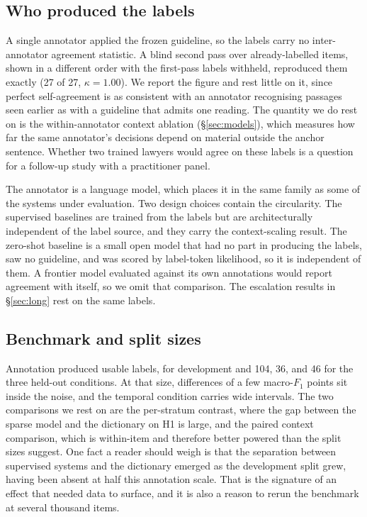 \subsection*{Who produced the labels} A single annotator applied the frozen
guideline, so the labels carry no inter-annotator agreement statistic. A blind
second pass over already-labelled items, shown in a different order with the
first-pass labels withheld, reproduced them exactly (27 of 27, $\kappa=1.00$). We
report the figure and rest little on it, since perfect self-agreement is as
consistent with an annotator recognising passages seen earlier as with a
guideline that admits one reading. The quantity we do rest on is the
within-annotator context ablation (\S\ref{sec:models}), which measures how far
the same annotator's decisions depend on material outside the anchor sentence.
Whether two trained lawyers would agree on these labels is a question for a
follow-up study with a practitioner panel.

The annotator is a language model, which places it in the same family as some of
the systems under evaluation. Two design choices contain the circularity. The
supervised baselines are trained from the labels but are architecturally
independent of the label source, and they carry the context-scaling result. The
zero-shot baseline is a small open model that had no part in producing the
labels, saw no guideline, and was scored by label-token likelihood, so it is
independent of them. A frontier model evaluated against its own annotations would
report agreement with itself, so we omit that comparison. The escalation results
in \S\ref{sec:long} rest on the same labels.

\subsection*{Benchmark and split sizes} Annotation produced \NBench{} usable
labels, \NDev{} for development and 104, 36, and 46 for the three held-out
conditions. At that size, differences of a few macro-$F_1$ points sit inside the
noise, and the temporal condition carries wide intervals. The two comparisons we
rest on are the per-stratum contrast, where the gap between the sparse model and
the dictionary on H1 is large, and the paired context comparison, which is
within-item and therefore better powered than the split sizes suggest. One fact a
reader should weigh is that the separation between supervised systems and the
dictionary emerged as the development split grew, having been absent at half this
annotation scale. That is the signature of an effect that needed data to surface,
and it is also a reason to rerun the benchmark at several thousand items.

